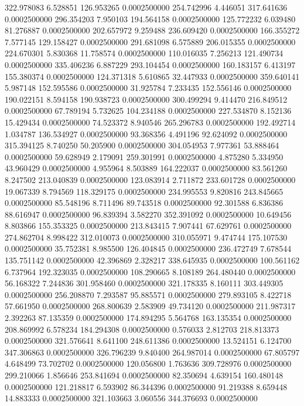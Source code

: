 322.978083 6.528851 126.953265 0.0002500000
254.742996 4.446051 317.641636 0.0002500000
296.354203 7.950103 194.564158 0.0002500000
125.772232 6.039480 81.276887 0.0002500000
202.657972 9.259488 236.609420 0.0002500000
166.355272 7.577145 129.158427 0.0002500000
291.681098 6.575889 206.015355 0.0002500000
224.670301 5.830368 11.758574 0.0002500000
110.016035 7.256213 121.490734 0.0002500000
335.406236 6.887229 293.104454 0.0002500000
160.183157 6.413197 155.380374 0.0002500000
124.371318 5.610865 32.447933 0.0002500000
359.640141 5.987148 152.595586 0.0002500000
31.925784 7.233435 152.556146 0.0002500000
190.022151 8.594158 190.938723 0.0002500000
300.499294 9.414470 216.849512 0.0002500000
67.789194 5.732625 104.234188 0.0002500000
227.534870 8.152136 15.429434 0.0002500000
74.523372 8.940546 265.296783 0.0002500000
192.492714 1.034787 136.534927 0.0002500000
93.368356 4.491196 92.624092 0.0002500000
315.394125 8.740250 50.205900 0.0002500000
304.054953 7.977361 53.888464 0.0002500000
59.628949 2.179091 259.301991 0.0002500000
4.875280 5.334950 43.960429 0.0002500000
4.955964 8.503889 164.222037 0.0002500000
83.561260 8.247502 213.040839 0.0002500000
123.083914 2.711872 233.601728 0.0002500000
19.067339 8.794569 118.329175 0.0002500000
234.995553 9.820816 243.845665 0.0002500000
85.548196 8.711496 89.743518 0.0002500000
92.301588 6.836386 88.616947 0.0002500000
96.839394 3.582270 352.391092 0.0002500000
10.649456 8.803866 155.353325 0.0002500000
213.843415 7.907441 67.629761 0.0002500000
274.862704 8.998422 312.010073 0.0002500000
310.055971 9.474744 175.107530 0.0002500000
35.752381 8.985500 126.404845 0.0002500000
236.472749 7.678544 135.751142 0.0002500000
42.396869 2.328217 338.645935 0.0002500000
100.561162 6.737964 192.323035 0.0002500000
108.290665 8.108189 264.480440 0.0002500000
56.168322 7.244836 301.958460 0.0002500000
321.178335 8.160111 303.449305 0.0002500000
256.208870 7.293587 95.885571 0.0002500000
279.893105 8.422718 57.661950 0.0002500000
268.800639 2.583909 49.734120 0.0002500000
211.987317 2.392263 87.135359 0.0002500000
174.894295 5.564768 163.135354 0.0002500000
208.869992 6.578234 184.294308 0.0002500000
0.576033 2.812703 218.813373 0.0002500000
321.576641 8.641100 248.611386 0.0002500000
13.524151 6.124700 347.306863 0.0002500000
326.796239 9.840400 264.987014 0.0002500000
67.805797 4.648499 73.702702 0.0002500000
120.056800 1.763636 309.728976 0.0002500000
299.210066 1.856646 253.841694 0.0002500000
82.350694 4.639154 160.480148 0.0002500000
121.218817 6.593902 86.344396 0.0002500000
91.219388 8.659448 14.883333 0.0002500000
321.103663 3.060556 344.376693 0.0002500000
